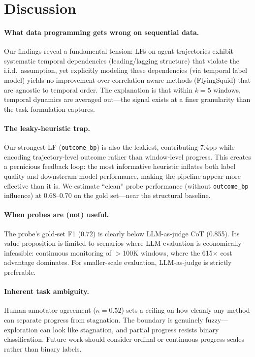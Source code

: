 \documentclass[11pt,a4paper]{article}
\begin{document}
\section{Discussion}

\paragraph{What data programming gets wrong on sequential data.}
Our findings reveal a fundamental tension: LFs on agent trajectories exhibit systematic temporal dependencies (leading/lagging structure) that violate the i.i.d.\ assumption, yet explicitly modeling these dependencies (via temporal label model) yields no improvement over correlation-aware methods (FlyingSquid) that are agnostic to temporal order.
The explanation is that within $k{=}5$ windows, temporal dynamics are averaged out---the signal exists at a finer granularity than the task formulation captures.

\paragraph{The leaky-heuristic trap.}
Our strongest LF (\texttt{outcome\_bp}) is also the leakiest, contributing 7.4pp while encoding trajectory-level outcome rather than window-level progress.
This creates a pernicious feedback loop: the most informative heuristic inflates both label quality and downstream model performance, making the pipeline appear more effective than it is.
We estimate ``clean'' probe performance (without \texttt{outcome\_bp} influence) at 0.68--0.70 on the gold set---near the structural baseline.

\paragraph{When probes are (not) useful.}
The probe's gold-set F1 (0.72) is clearly below LLM-as-judge CoT (0.855).
Its value proposition is limited to scenarios where LLM evaluation is economically infeasible: continuous monitoring of $>$100K windows, where the 615$\times$ cost advantage dominates.
For smaller-scale evaluation, LLM-as-judge is strictly preferable.

\paragraph{Inherent task ambiguity.}
Human annotator agreement ($\kappa{=}0.52$) sets a ceiling on how cleanly any method can separate progress from stagnation.
The boundary is genuinely fuzzy---exploration can look like stagnation, and partial progress resists binary classification.
Future work should consider ordinal or continuous progress scales rather than binary labels.
\end{document}
